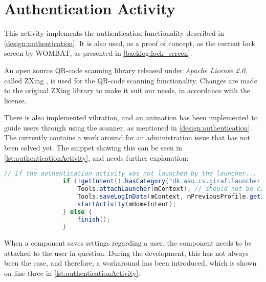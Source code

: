 \section{Authentication Activity}

This activity implements the authentication functionality described in \autoref{design:authentication}. 
It is also used, as a proof of concept, as the current lock screen by WOMBAT, as presented in \autoref{backlog:lock_screen}.

An open source QR-code scanning library released under \emph{Apache License 2.0}, called ZXing \citep{web:ZXing}, is used for the QR-code scanning functionality.
Changes are made to the original ZXing library to make it suit our needs, in accordance with the license.

There is also implemented vibration, and an animation has been implemented to guide users through using the scanner, as mentioned in \autoref{design:authentication}.\\

The  currently contains a work around for an administration issue that has not been solved yet.
The snippet showing this can be seen in \autoref{lst:authenticationActivity}, and needs further explanation:

\begin{lstlisting}[style=sourceCode, language=JAVA, caption=Code snippet from the AuthenticationActivity, label=lst:authenticationActivity] 
				// If the authentication activity was not launched by the launcher...
				if (!getIntent().hasCategory("dk.aau.cs.giraf.launcher.GIRAF")) {
					Tools.attachLauncher(mContext); // should not be called
					Tools.saveLogInData(mContext, mPreviousProfile.getId());
					startActivity(mHomeIntent);
				} else {
					finish();
				}
\end{lstlisting}

When a \giraf[] component saves settings regarding a user, the component needs to be attached to the user in question.
During the development, this has not always been the case, and therefore, a workaround has been introduced, which is shown on line three in \autoref{lst:authenticationActivity}.